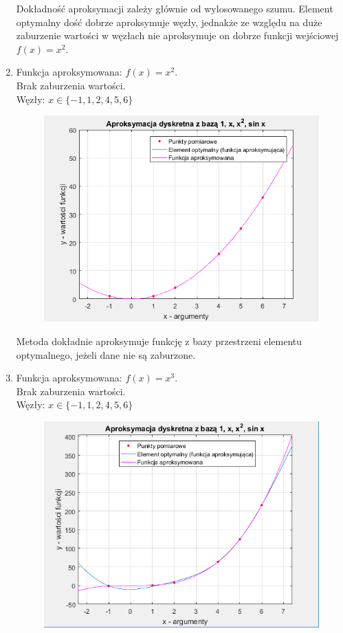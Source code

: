 \documentclass[12pt]{article}
\begin{document}
\begin{enumerate}[label=\textbf{Przykład \arabic*}]
		Dokładność aproksymacji zależy głównie od wylosowanego szumu. Element optymalny dość dobrze aproksymuje węzły, jednakże ze względu na duże zaburzenie wartości w węzłach nie aproksymuje on dobrze funkcji wejściowej $f(x) = x^2$.
		
		\item
		Funkcja aproksymowana: $f(x) = x^2$.\\
		Brak zaburzenia wartości.\\
		Węzły: $x \in \{-1, 1, 2, 4, 5, 6\}$
		
		\begin{figure}[H]
			\centering
			\includegraphics[scale=0.8]{images/example-2.png}
		\end{figure}
		
		Metoda dokładnie aproksymuje funkcję z bazy przestrzeni elementu optymalnego, jeżeli dane nie są zaburzone.
		
		\item
		Funkcja aproksymowana: $f(x) = x^3$.\\
		Brak zaburzenia wartości.\\
		Węzły: $x \in \{-1, 1, 2, 4, 5, 6\}$
		
		\begin{figure}[H]
			\centering
			\includegraphics[scale=0.8]{images/example-3.png}
		\end{figure}
		

\end{enumerate}
\end{document}
